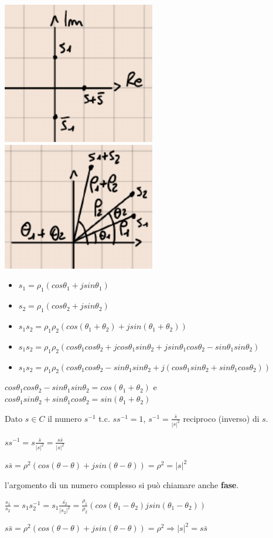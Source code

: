 \documentclass[a4paper, 12pt]{book}
\theoremstyle{plain}
\begin{document}
\begin{center}
    \includegraphics[width=0.5\textwidth]{num_comp7.png}
    \includegraphics[width=0.5\textwidth]{num_comp8.png}
\end{center}
\begin{itemize}
    \item $s_1 = \rho_1(cos\theta_1+jsin\theta_1)$
    \item $s_2 = \rho_1(cos\theta_2+jsin\theta_2)$
    \item $s_1s_2=\rho_1\rho_2(cos(\theta_1+\theta_2)+jsin(\theta_1+\theta_2))$
    \item $s_1s_2=\rho_1\rho_2(cos\theta_1cos\theta_2+jcos\theta_1sin\theta_2+jsin\theta_1cos\theta_2-sin\theta_1sin\theta_2)$
    \item $s_1s_2=\rho_1\rho_2(cos\theta_1cos\theta_2-sin\theta_1sin\theta_2+j(cos\theta_1sin\theta_2+sin\theta_1cos\theta_2))$
\end{itemize}
\begin{description}
    \item[N.B.:] $cos\theta_1cos\theta_2-sin\theta_1sin\theta_2=cos(\theta_1+\theta_2)$ e 
    $cos\theta_1sin\theta_2+sin\theta_1cos\theta_2=sin(\theta_1+\theta_2)$
    \item [Def:]Dato $s\in C$ il numero $s^{-1}$ t.c. $ss^{-1}=1$, $s^{-1}=\frac{\bar{s}}{|s|^2}$ reciproco
    (inverso) di $s$.
    \item $ss^{-1}=s\frac{\bar{s}}{|s|^2}=\frac{s\bar{s}}{|s|^2}$
    \item $s\bar{s}=\rho^2(cos(\theta-\theta)+jsin(\theta-\theta))=\rho^2=|s|^2$
    \item [Osservazione:]l'argomento di un numero complesso si può chiamare anche \textbf{fase}.
    \item $\frac{s_1}{s_2}=s_1s_2^{-1}=s_1\frac{\bar{s_2}}{|s_2|^2}=\frac{\rho_1}{\rho_2}(cos(\theta_1-\theta_2)
    jsin(\theta_1-\theta_2))$
    \item [Osservazione:] $s\bar{s}=\rho^2(cos(\theta-\theta)+jsin(\theta-\theta))=\rho^2\Rightarrow|s|^2=s\bar{s}$ 
\end{description}
\end{document}
